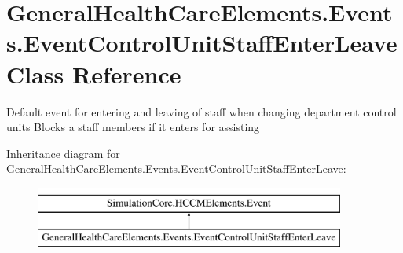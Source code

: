 \hypertarget{class_general_health_care_elements_1_1_events_1_1_event_control_unit_staff_enter_leave}{}\section{General\+Health\+Care\+Elements.\+Events.\+Event\+Control\+Unit\+Staff\+Enter\+Leave Class Reference}
\label{class_general_health_care_elements_1_1_events_1_1_event_control_unit_staff_enter_leave}


Default event for entering and leaving of staff when changing department control units Blocks a staff members if it enters for assisting  


Inheritance diagram for General\+Health\+Care\+Elements.\+Events.\+Event\+Control\+Unit\+Staff\+Enter\+Leave\+:\begin{figure}[H]
\begin{center}
\leavevmode
\includegraphics[height=2.000000cm]{class_general_health_care_elements_1_1_events_1_1_event_control_unit_staff_enter_leave}
\end{center}
\end{figure}
